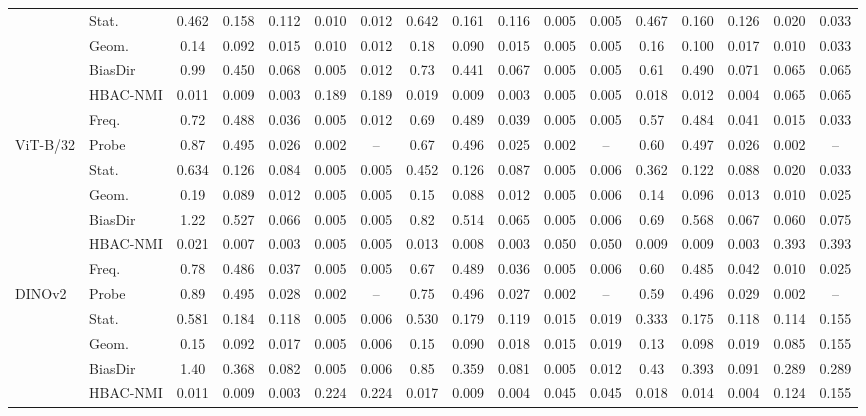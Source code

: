 \begin{tabular}{llccccccccccccccc}
 & Stat. & 0.462 & 0.158 & 0.112 & 0.010 & 0.012 & 0.642 & 0.161 & 0.116 & 0.005 & 0.005 & 0.467 & 0.160 & 0.126 & 0.020 & 0.033 \\
 & Geom. & 0.14 & 0.092 & 0.015 & 0.010 & 0.012 & 0.18 & 0.090 & 0.015 & 0.005 & 0.005 & 0.16 & 0.100 & 0.017 & 0.010 & 0.033 \\
 & BiasDir & 0.99 & 0.450 & 0.068 & 0.005 & 0.012 & 0.73 & 0.441 & 0.067 & 0.005 & 0.005 & 0.61 & 0.490 & 0.071 & 0.065 & 0.065 \\
 & HBAC-NMI & 0.011 & 0.009 & 0.003 & 0.189 & 0.189 & 0.019 & 0.009 & 0.003 & 0.005 & 0.005 & 0.018 & 0.012 & 0.004 & 0.065 & 0.065 \\
 & Freq. & 0.72 & 0.488 & 0.036 & 0.005 & 0.012 & 0.69 & 0.489 & 0.039 & 0.005 & 0.005 & 0.57 & 0.484 & 0.041 & 0.015 & 0.033 \\
\midrule
ViT-B/32 & Probe & 0.87 & 0.495 & 0.026 & 0.002 & -- & 0.67 & 0.496 & 0.025 & 0.002 & -- & 0.60 & 0.497 & 0.026 & 0.002 & -- \\
 & Stat. & 0.634 & 0.126 & 0.084 & 0.005 & 0.005 & 0.452 & 0.126 & 0.087 & 0.005 & 0.006 & 0.362 & 0.122 & 0.088 & 0.020 & 0.033 \\
 & Geom. & 0.19 & 0.089 & 0.012 & 0.005 & 0.005 & 0.15 & 0.088 & 0.012 & 0.005 & 0.006 & 0.14 & 0.096 & 0.013 & 0.010 & 0.025 \\
 & BiasDir & 1.22 & 0.527 & 0.066 & 0.005 & 0.005 & 0.82 & 0.514 & 0.065 & 0.005 & 0.006 & 0.69 & 0.568 & 0.067 & 0.060 & 0.075 \\
 & HBAC-NMI & 0.021 & 0.007 & 0.003 & 0.005 & 0.005 & 0.013 & 0.008 & 0.003 & 0.050 & 0.050 & 0.009 & 0.009 & 0.003 & 0.393 & 0.393 \\
 & Freq. & 0.78 & 0.486 & 0.037 & 0.005 & 0.005 & 0.67 & 0.489 & 0.036 & 0.005 & 0.006 & 0.60 & 0.485 & 0.042 & 0.010 & 0.025 \\
\midrule
DINOv2 & Probe & 0.89 & 0.495 & 0.028 & 0.002 & -- & 0.75 & 0.496 & 0.027 & 0.002 & -- & 0.59 & 0.496 & 0.029 & 0.002 & -- \\
 & Stat. & 0.581 & 0.184 & 0.118 & 0.005 & 0.006 & 0.530 & 0.179 & 0.119 & 0.015 & 0.019 & 0.333 & 0.175 & 0.118 & 0.114 & 0.155 \\
 & Geom. & 0.15 & 0.092 & 0.017 & 0.005 & 0.006 & 0.15 & 0.090 & 0.018 & 0.015 & 0.019 & 0.13 & 0.098 & 0.019 & 0.085 & 0.155 \\
 & BiasDir & 1.40 & 0.368 & 0.082 & 0.005 & 0.006 & 0.85 & 0.359 & 0.081 & 0.005 & 0.012 & 0.43 & 0.393 & 0.091 & 0.289 & 0.289 \\
 & HBAC-NMI & 0.011 & 0.009 & 0.003 & 0.224 & 0.224 & 0.017 & 0.009 & 0.004 & 0.045 & 0.045 & 0.018 & 0.014 & 0.004 & 0.124 & 0.155 \\

\end{tabular}

